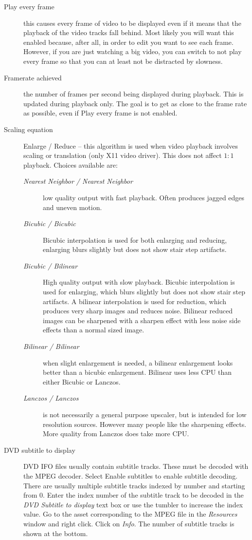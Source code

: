 \begin{description}
    \item[Play every frame]  this causes every frame of video to be displayed even if it means that the playback of the video tracks fall behind. Most likely you will want this enabled because, after all, in order to edit you want to see each frame.  However, if you are just watching a big video, you can switch to not play every frame so that you can at least not be distracted by slowness.
    \item[Framerate achieved]  the number of frames per second being displayed during playback. This is updated during playback only.  The goal is to get as close to the frame rate as possible, even if Play every frame is not enabled.
    \item[Scaling equation]  Enlarge / Reduce -- this algorithm is used when video playback involves scaling or translation (only X11 video driver). This does not affect $1:1$ playback.  Choices available are:
    \begin{description}
        \item[\textit{Nearest Neighbor / Nearest Neighbor}] low quality output with fast playback. Often produces jagged edges and uneven motion.
        \item[\textit{Bicubic / Bicubic}] Bicubic interpolation is used for both enlarging and reducing, enlarging blurs slightly but does not show stair step artifacts.
        \item[\textit{Bicubic / Bilinear}] High quality output with slow playback. Bicubic interpolation is used for enlarging, which blurs slightly but does not show stair step artifacts. A bilinear interpolation is used for reduction, which produces very sharp images and reduces noise. Bilinear reduced images can be sharpened with a sharpen effect with less noise side effects than a normal sized image.
        \item[\textit{Bilinear / Bilinear}] when slight enlargement is needed, a bilinear enlargement looks better than a bicubic enlargement.  Bilinear uses less CPU than either Bicubic or Lanczos.
        \item[\textit{Lanczos / Lanczos}] is not necessarily a general purpose upscaler, but is intended for low resolution sources. However many people like the sharpening effects.  More quality from Lanczos does take more CPU.
    \end{description}
    \item[DVD subtitle to display] DVD IFO files usually contain subtitle tracks. These must be decoded with the MPEG decoder. Select Enable subtitles to enable subtitle decoding. There are usually multiple  subtitle tracks indexed by number and starting from 0. Enter the index number of the subtitle track to be decoded in the \textit{DVD Subtitle to display} text box or use the tumbler to increase the index value. Go to the asset corresponding to the MPEG file in the \textit{Resources} window and right click. Click on \textit{Info}. The number of subtitle tracks is shown at the bottom.

\end{description}
